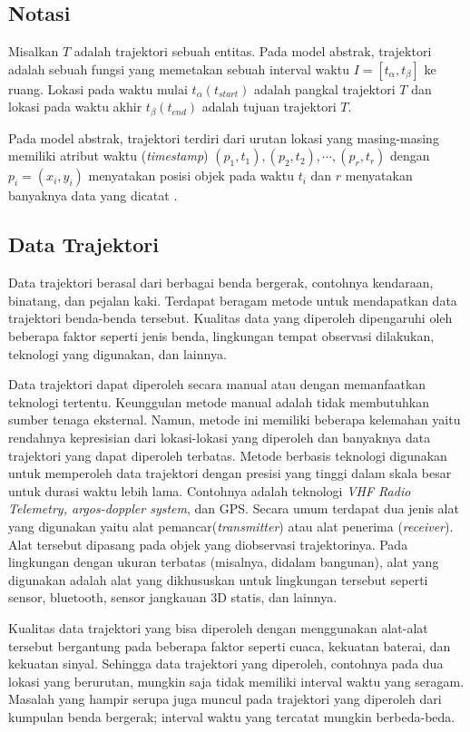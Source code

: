 \subsection{Notasi}
Misalkan $T$ adalah trajektori sebuah entitas. Pada model abstrak, trajektori adalah sebuah fungsi yang memetakan sebuah interval waktu $I=[t_{\alpha},t_{\beta}]$ ke ruang. Lokasi pada waktu mulai $t_{\alpha}(t_{start})$ adalah pangkal trajektori $T$ dan lokasi pada waktu akhir $t_{\beta}(t_{end})$ adalah tujuan trajektori $T$. 
\par Pada model abstrak, trajektori terdiri dari urutan lokasi yang masing-masing memiliki atribut waktu (\textit{timestamp}) $(p_{1},t_{1}),(p_{2},t_{2}),\cdots,(p_{r},t_{r})$ dengan $p_{i}=(x_{i},y_{i})$ menyatakan posisi objek pada waktu  $t_{i}$ dan $r$ menyatakan banyaknya data yang dicatat \cite{wiratma:19:computations}.

\subsection{Data Trajektori}
Data trajektori berasal dari berbagai benda bergerak, contohnya kendaraan, binatang, dan pejalan kaki. Terdapat beragam metode untuk mendapatkan data trajektori benda-benda tersebut. Kualitas data yang diperoleh dipengaruhi oleh beberapa faktor seperti jenis benda, lingkungan tempat observasi dilakukan, teknologi yang digunakan, dan lainnya.

\par Data trajektori dapat diperoleh secara manual atau dengan memanfaatkan teknologi tertentu. Keunggulan metode manual adalah tidak membutuhkan sumber tenaga eksternal. Namun, metode ini memiliki beberapa kelemahan yaitu rendahnya kepresisian dari lokasi-lokasi yang diperoleh dan banyaknya data trajektori yang dapat diperoleh terbatas. Metode berbasis teknologi digunakan untuk memperoleh data trajektori dengan presisi yang tinggi dalam skala besar untuk durasi waktu lebih lama. Contohnya adalah teknologi \textit{VHF Radio Telemetry, argos-doppler system}, dan GPS. Secara umum terdapat dua jenis alat yang digunakan yaitu alat pemancar(\textit{transmitter}) atau alat penerima (\textit{receiver}). Alat tersebut dipasang pada objek yang diobservasi trajektorinya. Pada lingkungan dengan ukuran terbatas (misalnya, didalam bangunan), alat yang digunakan adalah alat yang dikhususkan untuk lingkungan tersebut seperti sensor, bluetooth, sensor jangkauan 3D statis, dan lainnya.

\par Kualitas data trajektori yang bisa diperoleh dengan menggunakan alat-alat tersebut bergantung pada beberapa faktor seperti cuaca, kekuatan baterai, dan kekuatan sinyal. Sehingga data trajektori yang diperoleh, contohnya pada dua lokasi yang berurutan, mungkin saja tidak memiliki interval waktu yang seragam. Masalah yang hampir serupa juga muncul pada trajektori yang diperoleh dari kumpulan benda bergerak; interval waktu yang tercatat mungkin berbeda-beda.

